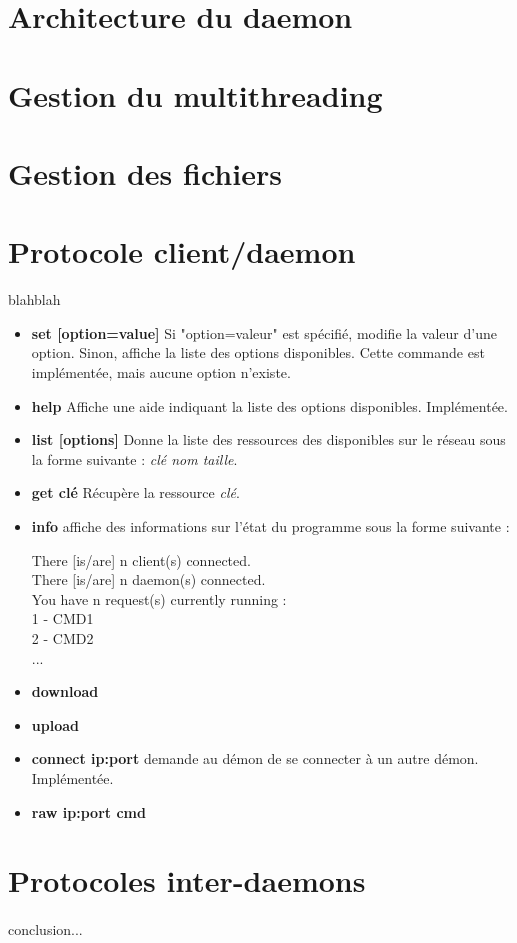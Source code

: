	\section{Architecture du daemon}
	
	\section{Gestion du multithreading}
	
	\section{Gestion des fichiers}
	
    \section{Protocole client/daemon}
    blahblah

\begin{itemize}
\item{\textbf{set [option=value]}} Si "option=valeur" est spécifié, modifie la valeur
d'une option. Sinon, affiche la liste des options disponibles. Cette commande
est implémentée, mais aucune option n'existe.

\item{\textbf{help}} Affiche une aide indiquant la liste des options
disponibles. Implémentée.

\item{\textbf{list [options]}} Donne la liste des ressources des disponibles sur
le réseau sous la forme suivante : \textit{clé nom taille}.

\item{\textbf{get clé}} Récupère la ressource \textit{clé}.

\item{\textbf{info}} affiche des informations sur l'état du programme sous la
forme suivante :

There [is/are] n client(s) connected.     \\
There [is/are] n daemon(s) connected.     \\
You have n request(s) currently running : \\
1 - CMD1                                  \\ 
2 - CMD2                                  \\
...

\item{\textbf{download}} 

\item{\textbf{upload}}

\item{\textbf{connect ip:port}} demande au démon de se connecter à un autre
démon. Implémentée.

\item{\textbf{raw ip:port cmd}}

\end{itemize} 
	
	\section{Protocoles inter-daemons}

	\paragraph*{}conclusion...
